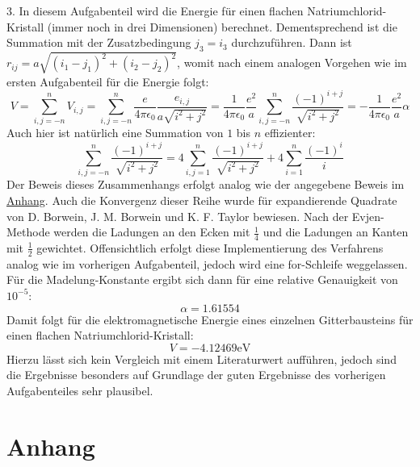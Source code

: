 \documentclass[11pt,a4paper]{article}
\begin{document}
3. In diesem Aufgabenteil wird die Energie für einen flachen Natriumchlorid-Kristall (immer noch in drei Dimensionen) berechnet. Dementsprechend ist die Summation mit der Zusatzbedingung $j_3 = i_3$ durchzuführen. Dann ist $r_{ij} = a\sqrt{(i_1 - j_1)^2 + (i_2 - j_2)^2}$, womit nach einem analogen Vorgehen wie im ersten Aufgabenteil für die Energie folgt:
\begin{equation*}
    V = \sum_{i,j=-n}^{n} V_{i,j} = \sum_{i,j=-n}^{n} \frac{e}{4\pi\epsilon_0} \frac{e_{i,j}}{a\sqrt{i^2 + j^2}} = \frac{1}{4\pi\epsilon_0} \frac{e^2}{a} \sum_{i,j=-n}^{n} \frac{(-1)^{i+j}}{\sqrt{i^2 + j^2}} = -\frac{1}{4\pi\epsilon_0} \frac{e^2}{a} \alpha
\end{equation*} Auch hier ist natürlich eine Summation von $1$ bis $n$ effizienter:
\begin{equation*}
    \sum_{i,j=-n}^{n} \frac{(-1)^{i+j}}{\sqrt{i^2 + j^2}} = 4\sum_{i,j=1}^{n} \frac{(-1)^{i+j}}{\sqrt{i^2 + j^2}} + 4\sum_{i=1}^{n} \frac{(-1)^{i}}{i}
\end{equation*} Der Beweis dieses Zusammenhangs erfolgt analog wie der angegebene Beweis im \hyperref[sec:anhang]{Anhang}. Auch die Konvergenz dieser Reihe wurde für expandierende Quadrate von D. Borwein, J. M. Borwein und K. F. Taylor bewiesen. Nach der Evjen-Methode werden die Ladungen an den Ecken mit $\frac{1}{4}$ und die Ladungen an Kanten mit $\frac{1}{2}$ gewichtet.
Offensichtlich erfolgt diese Implementierung des Verfahrens analog wie im vorherigen Aufgabenteil, jedoch wird eine for-Schleife weggelassen. Für die Madelung-Konstante ergibt sich dann für eine relative Genauigkeit von $10^{-5}$:
\begin{equation*}
    \alpha = 1.61554
\end{equation*} Damit folgt für die elektromagnetische Energie eines einzelnen Gitterbausteins für einen flachen Natriumchlorid-Kristall:
\begin{equation*}
    V = -4.12469 \si{\electronvolt}
\end{equation*} Hierzu lässt sich kein Vergleich mit einem Literaturwert aufführen, jedoch sind die Ergebnisse besonders auf Grundlage der guten Ergebnisse des vorherigen Aufgabenteiles sehr plausibel.


\section*{Anhang}\label{sec:anhang}
\end{document}
